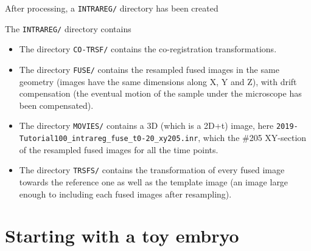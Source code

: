 After processing, a \texttt{INTRAREG/} directory has been created

\mbox{}
\mbox{}

The \texttt{INTRAREG/} directory contains

\mbox{}
\mbox{}

\begin{itemize}
\itemsep -1ex
\item The directory \texttt{CO-TRSF/} contains the co-registration
  transformations.
\item The directory \texttt{FUSE/} contains the resampled fused images
  in the same geometry (images have the same dimensions along X, Y and
  Z), with drift compensation (the eventual motion of the sample under the
  microscope has been compensated). 
\item The directory \texttt{MOVIES/} contains a 3D (which is a 2D+t)
  image, here
  \texttt{2019-Tutorial100\_intrareg\_fuse\_t0-20\_xy205.inr}, which
  the \#205 XY-section of the resampled fused images for all the time
  points.
\item The directory \texttt{TRSFS/}  contains the transformation of
  every fused image towards the reference one as well as the template
  image (an image large enough to including each fused images after
  resampling).
\end{itemize}




















\section{Starting with a toy embryo}

